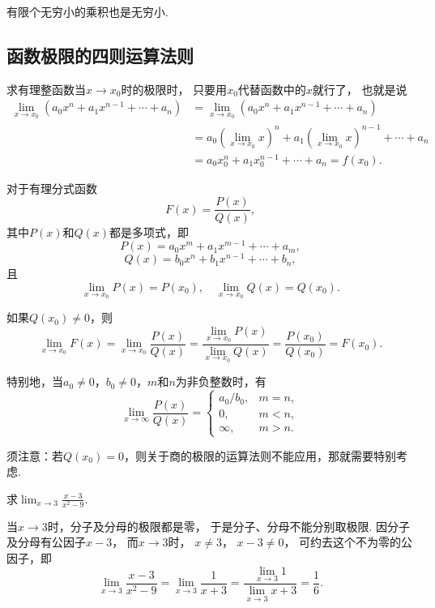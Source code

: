 \begin{corollary}
有限个无穷小的乘积也是无穷小.
\end{corollary}

\subsection{函数极限的四则运算法则}

\begin{example}\label{example:极限.有理整函数在一点的极限}
求有理整函数当\(x\to x_0\)时的极限时，
只要用\(x_0\)代替函数中的\(x\)就行了，
也就是说
\def\lx{\left(\lim_{x \to x_0} x\right)}
\begin{align*}
	\lim_{x \to x_0} (a_0 x^n + a_1 x^{n-1} + \dotsb + a_n)
	&= \lim_{x \to x_0}{(a_0 x^n + a_1 x^{n-1} + \dotsb + a_n)} \\
	&= a_0 \lx^n + a_1 \lx^{n-1} + \dotsb + a_n \\
	&= a_0 x_0^n + a_1 x_0^{n-1} + \dotsb + a_n
	= f(x_0).
\end{align*}
\end{example}

\begin{example}
对于有理分式函数\[
F(x) = \frac{P(x)}{Q(x)},
\]其中\(P(x)\)和\(Q(x)\)都是多项式，即\[
P(x) = a_0 x^m + a_1 x^{m-1} + \dotsb + a_m,
\]\[
Q(x) = b_0 x^n + b_1 x^{n-1} + \dotsb + b_n,
\]且\[
\lim_{x \to x_0} P(x) = P(x_0),
\quad
\lim_{x \to x_0} Q(x) = Q(x_0).
\]

如果\(Q(x_0) \neq 0\)，则\[
\lim_{x \to x_0} F(x)
= \lim_{x \to x_0} \frac{P(x)}{Q(x)}
= \frac{\lim_{x \to x_0} P(x)}{\lim_{x \to x_0} Q(x)}
= \frac{P(x_0)}{Q(x_0)}
= F(x_0).
\]

特别地，当\(a_0\neq0\)，\(b_0\neq0\)，\(m\)和\(n\)为非负整数时，有
\[
\lim_{x\to\infty}\frac{P(x)}{Q(x)} = \left\{ \begin{array}{cl}
a_0/b_0, & m=n, \\
0, & m<n, \\
\infty, & m>n.
\end{array} \right.
\]
\end{example}
须注意：若\(Q(x_0) = 0\)，则关于商的极限的运算法则不能应用，那就需要特别考虑.

\begin{example}
求\(\lim_{x\to3}\frac{x-3}{x^2-9}\).
\begin{solution}
当\(x\to3\)时，分子及分母的极限都是零，
于是分子、分母不能分别取极限.
因分子及分母有公因子\(x - 3\)，
而\(x\to3\)时，
\(x \neq 3\)，
\(x - 3 \neq 0\)，
可约去这个不为零的公因子，即\[
	\lim_{x\to3}\frac{x - 3}{x^2 - 9}
	= \lim_{x\to3}\frac{1}{x + 3}
	= \frac{\lim_{x\to3} 1}{\lim_{x\to3} x+3}
	= \frac{1}{6}.
\]
\end{solution}
\end{example}

